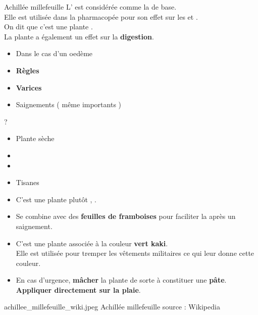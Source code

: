 \ficheidentiteplante
{Achillée millefeuille}
{%
    L' est considérée comme la  de base.\\ 
    Elle est utilisée dans la pharmacopée pour son effet sur les  et .\\
    On dit que c'est une plante .\\

    La plante a également un effet sur la \textbf{digestion}.
}
{%
    \begin{itemize}[label = \bcplume]
        \item Dans le cas d'un oedème
        \item \textbf{Règles}
        \item \textbf{Varices}
        \item Saignements ( même importants )
    \end{itemize}
}
{%
    ?
}
{%
    \begin{itemize}[label = \bccrayon]
        \item Plante sèche
        \item {}
        \item {}
        \item Tisanes
    \end{itemize}
}{%
    \begin{Remarque}

        \begin{itemize}[label = \bcplume]
            \item C'est une plante plutôt , .
            \item Se combine avec des \textbf{feuilles de framboises} pour faciliter la  après un saignement.
            \item C'est une plante  associée à la couleur \textbf{vert kaki}.\\Elle est utilisée pour tremper les vêtements militaires ce qui leur donne cette couleur. 
            \item[\bcattention] En cas d'urgence, \textbf{mâcher} la plante de sorte à constituer une \textbf{pâte}.\\ \textbf{Appliquer directement sur la plaie}.
        \end{itemize}
    \end{Remarque}
}
{%
    achillee_millefeuille_wiki.jpeg
}
{%
    Achillée millefeuille
}
{%
    source : Wikipedia 
}
